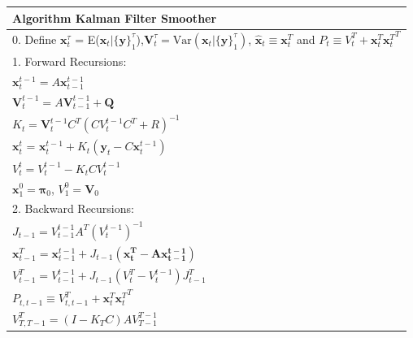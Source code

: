 \documentclass[fleqn]{article}
\newcommand{\T}{T}
\begin{document}
\begin{tabular}{l}
\hline
\textbf{Algorithm } Kalman Filter Smoother\\
\hline
0. Define $\mathbf{x}_t^{\tau}$ = E($\mathbf{x}_t|\{\mathbf{y}\}_1^{\tau}$),$\mathbf{V}_t^{\tau}=\text{Var}(\mathbf{x}_t|\{\mathbf{y}\}_1^{\tau})$, $\hat{\mathbf{x}}_t \equiv \mathbf{x}_t^T$ and $P_t\equiv V_t^T+\mathbf{x}_t^T{\mathbf{x}_t^T}^{\T}$\\
1. Forward Recursions:\\
\hspace{4 mm} $\mathbf{x}_t^{t-1}=A\mathbf{x}_{t-1}^{t-1}$\\
\hspace{4 mm} $\mathbf{V}_t^{t-1}=A\mathbf{V}_{t-1}^{t-1}+\mathbf{Q}$\\
\hspace{4 mm} $K_t=\mathbf{V}_t^{t-1}C^{\T}(CV_t^{t-1}C^{\T}+R)^{-1}$\\
\hspace{4 mm} $\mathbf{x}_t^t$ = $\mathbf{x}_t^{t-1} + K_t (\mathbf{y}_t - C\mathbf{x}_t^{t-1})$\\
\hspace{4 mm} $V_t^t=V_t^{t-1}-K_tCV_t^{t-1}$\\
\hspace{4 mm} $\mathbf{x}_1^0=\mathbf{\pi}_0$, $V_1^0=\mathbf{V}_0$\\
2. Backward Recursions:\\
\hspace{4 mm} $J_{t-1} = V_{t-1}^{t-1}A^{\T}(V_t^{t-1})^{-1}$\\
\hspace{4 mm} $\mathbf{x}_{t-1}^T=\mathbf{x}_{t-1}^{t-1}+J_{t-1}(\mathbf{x_t^T-A\mathbf{x}_{t-1}^{t-1}})$\\
\hspace{4 mm} $V_{t-1}^T = V_{t-1}^{t-1}+J_{t-1}(V_t^T-V_t^{t-1})J_{t-1}^{\T}$\\
\hspace{4 mm} $P_{t,t-1}\equiv V_{t,t-1}^T+\mathbf{x}_t^T{\mathbf{x}_t^T}^{\T}$\\
\hspace{4 mm} $V_{T,T-1}^T=(I-K_TC)AV_{T-1}^{T-1}$\\
\hline
\end{tabular}

\newpage
\end{document}
